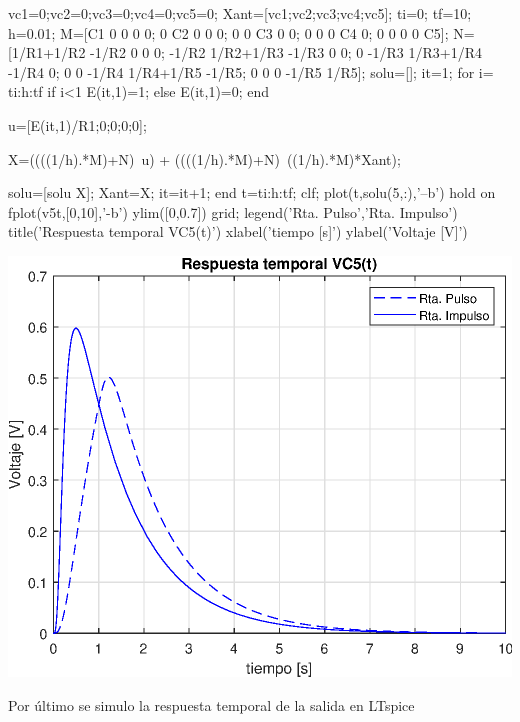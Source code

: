 \documentclass[10pt,a4paper]{article} %
\begin{document}
	
	
	\begin{matlabcode}
	vc1=0;vc2=0;vc3=0;vc4=0;vc5=0;
	Xant=[vc1;vc2;vc3;vc4;vc5];
	ti=0;
	tf=10;
	h=0.01;
	M=[C1 0 0 0 0; 0 C2 0 0 0; 0 0 C3 0 0; 0 0 0 C4 0; 0 0 0 0 C5];
	N=[1/R1+1/R2 -1/R2 0 0 0; -1/R2 1/R2+1/R3 -1/R3 0 0; 0 -1/R3 1/R3+1/R4 -1/R4 0; 0 0 -1/R4 1/R4+1/R5 -1/R5; 0 0 0 -1/R5 1/R5];
	solu=[];
	it=1;
	for i= ti:h:tf
	if i<1
	E(it,1)=1;
	else
	E(it,1)=0;
	end
	
	u=[E(it,1)/R1;0;0;0;0];
	
	X=((((1/h).*M)+N)\ u) + ((((1/h).*M)+N)\ ((1/h).*M)*Xant);
	
	solu=[solu X];
	Xant=X;
	it=it+1;
	end
	t=ti:h:tf;
	clf;
	plot(t,solu(5,:),'--b')
	hold on
	fplot(v5t,[0,10],'-b')
	ylim([0,0.7])
	grid;
	legend({'Rta. Pulso','Rta. Impulso'})
	title('Respuesta temporal VC5(t)')
	xlabel('tiempo [s]')
	ylabel('Voltaje [V]')
	\end{matlabcode}
	\begin{center}
	\includegraphics[width=\maxwidth{56.196688409433015em}]{figure_0_09}
	\end{center}
Por último se simulo la respuesta temporal de la salida en LTspice 
\end{document}

